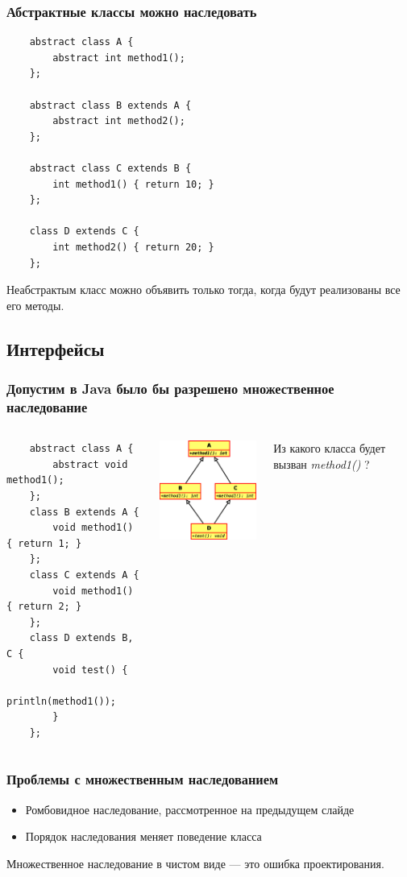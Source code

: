 \begin{frame}[fragile]
	\frametitle{Абстрактные классы можно наследовать}
	\begin{verbatim}
	abstract class A {
	    abstract int method1();
	};

	abstract class B extends A {
	    abstract int method2();
	};

	abstract class C extends B {
	    int method1() { return 10; }
	};

	class D extends C {
	    int method2() { return 20; }
	};
	\end{verbatim}

	Неабстрактым класс можно объявить только тогда, когда будут реализованы все его методы.
\end{frame}

\subsection{Интерфейсы}
\begin{frame}[fragile]
	\frametitle{Допустим в Java было бы разрешено множественное наследование}

	\begin{columns}[c]
	\column{2.55in}
	\begin{verbatim}
	abstract class A {
	    abstract void method1();
	};
	class B extends A {
	    void method1() { return 1; }
	};
	class C extends A {
	    void method1() { return 2; }
	};
	class D extends B, C {
	    void test() {
	        println(method1());
	    }
	};
	\end{verbatim}
	\column{1.90in}
	\includegraphics[width=1.9in]{lesson-7-Diagram1.eps}

	\smallskip
	Из какого класса будет вызван \emph{method1()} ?
	\end{columns}
\end{frame}

\begin{frame}[fragile]
	\frametitle{Проблемы с множественным наследованием}
	\begin{large}
	\begin{itemize}
	\item{Ромбовидное наследование, рассмотренное на предыдущем слайде}
	\item{Порядок наследования меняет поведение класса}
	\end{itemize}

	Множественное наследование в чистом виде --- это ошибка проектирования.
	\end{large}
\end{frame}


